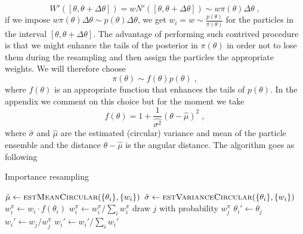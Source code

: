 \documentclass[aps, pra, 10pt, twocolumn, superscriptaddress,floatfix]{revtex4-1}
\begin{document}
%
\begin{equation}
	W'([\theta, \theta + \Delta \theta]) = w N'([\theta, \theta + \Delta \theta]) \sim w \pi(\theta) \Delta \theta \; ,
\end{equation}
%
if we impose $w \pi(\theta) \Delta \theta \sim p(\theta) \Delta \theta$, we get $w_i = w \sim \frac{p(\theta)}{\pi (\theta)}$ for the particles in the interval $[\theta, \theta+\Delta \theta]$. The advantage of performing such contrived procedure is that we might enhance the tails of the posterior in $\pi(\theta)$ in order not to lose them during the resampling and then assign the particles the appropriate weights. We will therefore choose
%
\begin{equation}
	\pi (\theta) \sim f(\theta) p(\theta) \; ,
\end{equation}
%
where $f(\theta)$ is an appropriate function that enhances the tails of $p(\theta)$. In the appendix we comment on this choice but for the moment we take
%
\begin{equation}
	f(\theta) = 1 + \frac{1}{\hat{\sigma^2}} (\theta - \hat{\mu})^2 \; ,
\end{equation}
%
where $\hat{\sigma}$ and $\hat{\mu}$ are the estimated (circular) variance and mean of the particle ensemble and the distance $\theta - \hat{\mu}$ is the angular distance. The algorithm goes as following
%
\begin{algorithm}[H]
	\caption{Importance resampling}
	\label{alg:importanceResampling}
	\begin{algorithmic}[1]
		\State $\hat{\mu} \gets \Call{estMeanCircular}{\lbrace \theta_i \rbrace, \lbrace w_i \rbrace}$
		\State $\hat{\sigma} \gets \Call{estVarianceCircular}{\lbrace \theta_i \rbrace, \lbrace w_i \rbrace}$
		\State $w^\pi_i \gets w_i \cdot f(\theta_i)$
		\EndFor
		\State $w^\pi_i \gets w^\pi_i/\sum_{i} w^\pi_i$
		\State draw $j$ with probability $w^\pi_j$
		\State $\theta_i' \gets \theta_j$
		\State $w_i' \gets w_j/w^\pi_j$
		\EndFor
		\State $w_i' \gets w_i'/\sum_{i} w_i'$
		\EndFunction
	\end{algorithmic}
\end{algorithm}
%
\end{document}
